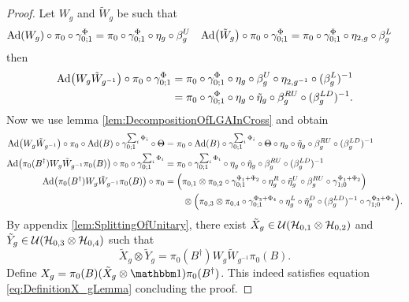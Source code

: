 \documentclass[12pt,a4paper,twoside]{article}
\numberwithin{equation}{section}
\begin{document}
\begin{proof}
	Let $W_g$ and $\tilde W_g$ be such that
	\begin{align}
		\Ad{W_g}\circ\pi_0\circ\gamma^\Phi_{0;1}& =\pi_0\circ\gamma^\Phi_{0;1}\circ\eta_g\circ\beta_g^U
		&\Ad{\tilde W_g} \circ\pi_0\circ\gamma^\Phi_{0;1}& =\pi_0\circ\gamma^\Phi_{0;1}\circ\eta_{2,g}\circ\beta_g^L
	\end{align}
	then
	\begin{align}
		\Ad{W_g\tilde{W}_{g^{-1}}}\circ\pi_0\circ\gamma^\Phi_{0;1}&=\pi_0\circ\gamma^\Phi_{0;1}\circ\eta_g\circ\beta_g^U\circ\eta_{2,g^{-1}}\circ(\beta_g^L)^{-1}\\
		&=\pi_0\circ\gamma^\Phi_{0;1}\circ\eta_g\circ\tilde{\eta}_g\circ\beta_g^{RU}\circ(\beta_g^{LD})^{-1}.
	\end{align}
	Now we use lemma \ref{lem:DecompositionOfLGAInCross} and obtain
	\begin{align}
		\Ad{W_g\tilde{W}_{g^{-1}}}\circ\pi_0\circ\Ad{B}\circ\gamma^{\sum_i\Phi_i}_{0;1}\circ\stkout{\Theta}&=\pi_0\circ\Ad{B}\circ\gamma^{\sum_i\Phi_i}_{0;1}\circ\stkout{\Theta}\circ\eta_g\circ\tilde{\eta}_g\circ\beta_g^{RU}\circ(\beta_g^{LD})^{-1}\\
		\Ad{\pi_0(B^\dagger)W_g\tilde{W}_{g^{-1}}\pi_0(B)}\circ\pi_0\circ\gamma^{\sum_i\Phi_i}_{0;1}&=\pi_0\circ\gamma^{\sum_i\Phi_i}_{0;1}\circ\eta_g\circ\tilde{\eta}_g\circ\beta_g^{RU}\circ(\beta_g^{LD})^{-1}\\
		\Ad{\pi_0(B^\dagger)W_g\tilde{W}_{g^{-1}}\pi_0(B)}\circ\pi_0&=\left(\pi_{0,1}\otimes\pi_{0,2}\circ\gamma^{\Phi_1+\Phi_2}_{0;1}\circ\eta_g^R\circ\tilde{\eta}_g^U\circ\beta_g^{RU}\circ\gamma^{\Phi_1+\Phi_2}_{1;0}\right)\\
		\nonumber
		&\qquad\otimes \left(\pi_{0,3}\otimes\pi_{0,4}\circ\gamma^{\Phi_3+\Phi_4}_{0;1}\circ\eta_g^L\circ\tilde{\eta}_g^D\circ(\beta_g^{LD})^{-1}\circ\gamma^{\Phi_3+\Phi_4}_{1;0}\right).
	\end{align}
	By appendix \ref{lem:SplittingOfUnitary}, there exist $\tilde{X}_g\in\mathcal U(\mathcal H_{0,1}\otimes\mathcal H_{0,2})$ and $\tilde{Y}_g\in\mathcal U(\mathcal H_{0,3}\otimes\mathcal H_{0,4})$ such that
	\begin{equation}
		\tilde{X}_g\otimes\tilde{Y}_g=\pi_0(B^\dagger)W_g\tilde{W}_{g^{-1}}\pi_0(B).
	\end{equation}
	Define $X_g=\pi_0(B)(\tilde{X}_g\otimes\id)\pi_0(B^\dagger)$. This indeed satisfies equation \eqref{eq:DefinitionX_gLemma} concluding the proof.
\end{proof}
\end{document}
